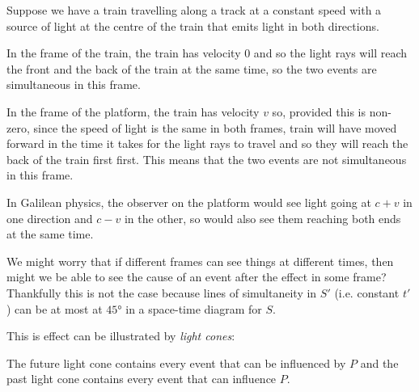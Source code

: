 \documentclass[../main.tex]{subfiles}
\begin{document}
\begin{example}
  Suppose we have a train travelling along a track at a constant speed with a source of light at the centre of the train that emits light in both directions.

  In the frame of the train, the train has velocity $0$ and so the light rays will reach the front and the back of the train at the same time, so the two events are simultaneous in this frame.

  In the frame of the platform, the train has velocity $v$ so, provided this is non-zero, since the speed of light is the same in both frames, train will have moved forward in the time it takes for the light rays to travel and so they will reach the back of the train first first.
  This means that the two events are not simultaneous in this frame.

  In Galilean physics, the observer on the platform would see light going at $c + v$ in one direction and $c - v$ in the other, so would also see them reaching both ends at the same time.
\end{example}
We might worry that if different frames can see things at different times, then might we be able to see the cause of an event after the effect in some frame?
Thankfully this is not the case because lines of simultaneity in $S'$ (i.e. constant $t'$) can be at most at $\ang{45}$ in a space-time diagram for $S$.

This is effect can be illustrated by \textit{light cones}:
\begin{center}
\end{center}
The future light cone contains every event that can be influenced by $P$ and the past light cone contains every event that can influence $P$.
\end{document}
